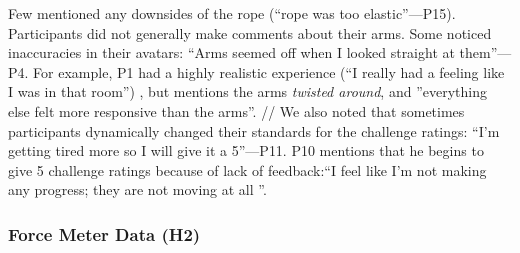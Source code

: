 Few mentioned any downsides of the rope (``rope was too elastic''---P15).\\
Participants did not generally make comments about their arms. Some noticed inaccuracies in their avatars: ``Arms seemed off when I looked straight at them''---P4. For example, P1 had a highly realistic experience (``I really had a feeling like I was in that room'') , but mentions the arms \textit{twisted around}, and ''everything else felt more responsive than the arms''. //
We also noted that sometimes participants dynamically changed their standards for the challenge ratings: ``I'm getting tired more so I will give it a 5''---P11. P10 mentions that he begins to give 5 challenge ratings because of lack of feedback:``I feel like I'm not making any progress; they are not moving at all ''.

\subsubsection{Force Meter Data (H2)}

